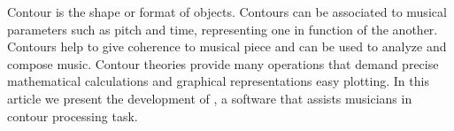 Contour is the shape or format of objects. Contours can be associated
to musical parameters such as pitch and time, representing one in
function of the another. Contours help to give coherence to musical
piece and can be used to analyze and compose music. Contour theories
provide many operations that demand precise mathematical calculations
and graphical representations easy plotting. In this article we
present the development of \goiaba{}, a software that assists
musicians in contour processing task.
